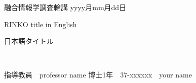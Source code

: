 \begin{framed}  %
    \vspace{5pt}
    \begin{CJK}{UTF8}{ipxm}融合情報学調査輪講 %
         \hspace{\fill} yyyy月mm月dd日 %
        \end{CJK}
    \begin{center}
        \vspace{5pt}
        {\Large 
        RINKO title in English %
        } \\
        \vspace{5pt}
        {\bf \begin{CJK}{UTF8}{ipxm}
        日本語タイトル %
        \end{CJK}} \\
    \end{center}
    \vspace{5pt}
    \begin{CJK}{UTF8}{ipxm}指導教員\ \ professor name %
        \hspace{\fill} 博士1年\ \ 37-xxxxxx\ \  your name %
    \end{CJK}
    \vspace{5pt}
\end{framed}